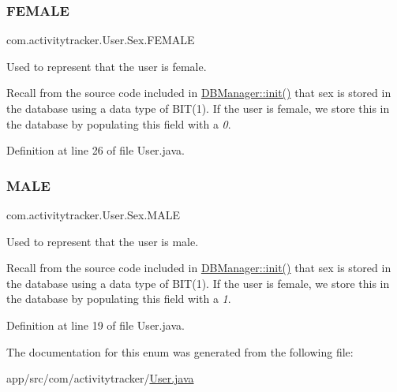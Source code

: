 \subsubsection{\texorpdfstring{FEMALE}{FEMALE}}
{\footnotesize\ttfamily com.\+activitytracker.\+User.\+Sex.\+F\+E\+M\+A\+LE}

Used to represent that the user is female.

Recall from the source code included in \mbox{\hyperlink{classcom_1_1activitytracker_1_1_d_b_manager_a41df4600bb5901a26a4ea6a7108a70b9}{D\+B\+Manager\+::init()}} that sex is stored in the database using a data type of B\+I\+T(1). If the user is female, we store this in the database by populating this field with a {\itshape 0}. 

Definition at line 26 of file User.\+java.

\mbox{\label{enumcom_1_1activitytracker_1_1_user_1_1_sex_ad3b626a38bd4615eb621d75b939f412d}} 
\subsubsection{\texorpdfstring{MALE}{MALE}}
{\footnotesize\ttfamily com.\+activitytracker.\+User.\+Sex.\+M\+A\+LE}

Used to represent that the user is male.

Recall from the source code included in \mbox{\hyperlink{classcom_1_1activitytracker_1_1_d_b_manager_a41df4600bb5901a26a4ea6a7108a70b9}{D\+B\+Manager\+::init()}} that sex is stored in the database using a data type of B\+I\+T(1). If the user is female, we store this in the database by populating this field with a {\itshape 1}. 

Definition at line 19 of file User.\+java.



The documentation for this enum was generated from the following file\+:\begin{DoxyCompactItemize}
\item 
app/src/com/activitytracker/\mbox{\hyperlink{_user_8java}{User.\+java}}\end{DoxyCompactItemize}
